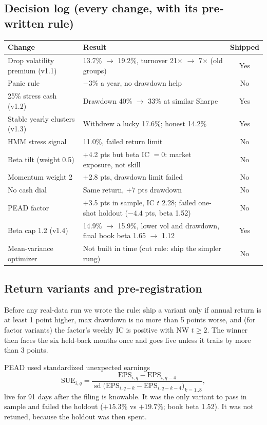 \documentclass[11pt]{article}
\begin{document}
\subsection{Decision log (every change, with its pre-written rule)}
\begin{table}[H]\centering\small
\begin{tabularx}{\textwidth}{lLc}
\toprule
Change & Result & Shipped \\
\midrule
Drop volatility premium (v1.1) & 13.7\% $\to$ 19.2\%, turnover 21$\times$ $\to$ 7$\times$ (old groups) & Yes \\
Panic rule & $-3\%$ a year, no drawdown help & No \\
25\% stress cash (v1.2) & Drawdown 40\% $\to$ 33\% at similar Sharpe & Yes \\
Stable yearly clusters (v1.3) & Withdrew a lucky 17.6\%; honest 14.2\% & Yes \\
HMM stress signal & 11.0\%, failed return limit & No \\
Beta tilt (weight 0.5) & +4.2 pts but beta IC $=0$: market exposure, not skill & No \\
Momentum weight 2 & +2.8 pts, drawdown limit failed & No \\
No cash dial & Same return, +7 pts drawdown & No \\
PEAD factor & +3.5 pts in sample, IC $t$ 2.28; failed one-shot holdout ($-4.4$ pts, beta 1.52) & No \\
Beta cap 1.2 (v1.4) & 14.9\% $\to$ 15.9\%, lower vol and drawdown, final book beta 1.65 $\to$ 1.12 & Yes \\
Mean-variance optimizer & Not built in time (cut rule: ship the simpler rung) & No \\
\bottomrule
\end{tabularx}
\end{table}

\subsection{Return variants and pre-registration}\label{sec:variants}
Before any real-data run we wrote the rule: ship a variant only if annual return is at least 1 point higher, max
drawdown is no more than 5 points worse, and (for factor variants) the factor's weekly IC is positive with NW $t\ge2$.
The winner then faces the six held-back months once and goes live unless it trails by more than 3 points.

PEAD used standardized unexpected earnings
\[
\text{SUE}_{i,q} = \frac{\text{EPS}_{i,q}-\text{EPS}_{i,q-4}}{\operatorname{sd}\big(\text{EPS}_{i,q-k}-\text{EPS}_{i,q-k-4}\big)_{k=1..8}},
\]
live for 91 days after the filing is knowable. It was the only variant to pass in sample and failed the holdout
($+15.3\%$ vs $+19.7\%$; book beta 1.52). It was not retuned, because the holdout was then spent.
\end{document}
